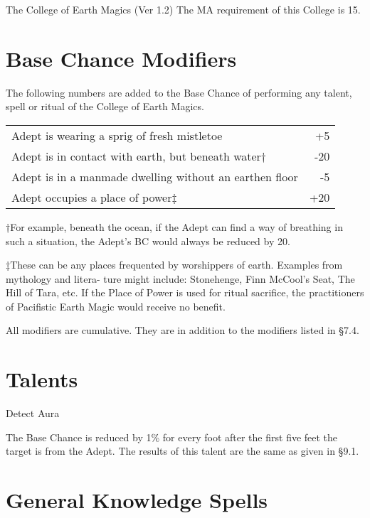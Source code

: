 \begin{Chapter}{The College of Earth Magics (Ver 1.2)}
The MA requirement of this College is 15. 


\section{Base Chance Modifiers}

The following numbers are added to the Base Chance of performing any
talent, spell or ritual of the College of Earth Magics.

\begin{tabularx}{\columnwidth}{Xr}
Adept is wearing a sprig of fresh mistletoe & +5 \\
Adept is in contact with earth, but beneath water† & -20 \\
Adept is in a manmade dwelling without an earthen floor & -5 \\
Adept occupies a place of power‡	& +20 \\
\end{tabularx}

†For example, beneath the ocean, if the Adept can find a way of
breathing in such a situation, the Adept’s BC would always be reduced
by 20.

‡These can be any places frequented by worshippers of earth. Examples
from mythology and litera- ture might include: Stonehenge, Finn
McCool’s Seat, The Hill of Tara, etc. If the Place of Power is used
for ritual sacrifice, the practitioners of Pacifistic Earth Magic
would receive no benefit.

All modifiers are cumulative. They are in addition to the modifiers
listed in §7.4.

\section{Talents}

\begin{talent}[T-1]{Detect Aura }

\begin{effects}
The Base Chance is reduced by 1\% for every foot after the first five
feet the target is from the Adept. The results of this talent are the
same as given in §9.1.
\end{effects}
\end{talent}

\section{General Knowledge Spells}


\end{Chapter}
